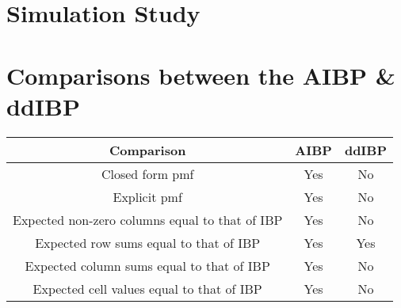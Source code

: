 \section{Simulation Study}

\section{Comparisons between the AIBP \& ddIBP}
\begin{center}
  \begin{tabular}{c|c|c}
    \hline
      Comparison & AIBP & ddIBP \\ \hline \hline
      Closed form pmf & Yes & No \\ \hline
      Explicit pmf & Yes & No \\ \hline
      Expected non-zero columns equal to that of IBP & Yes & No \\ \hline
      Expected row sums equal to that of IBP & Yes & Yes \\ \hline
      Expected column sums equal to that of IBP & Yes & No \\ \hline
      Expected cell values equal to that of IBP & Yes & No \\ \hline
    \hline
  \end{tabular}
\end{center}

